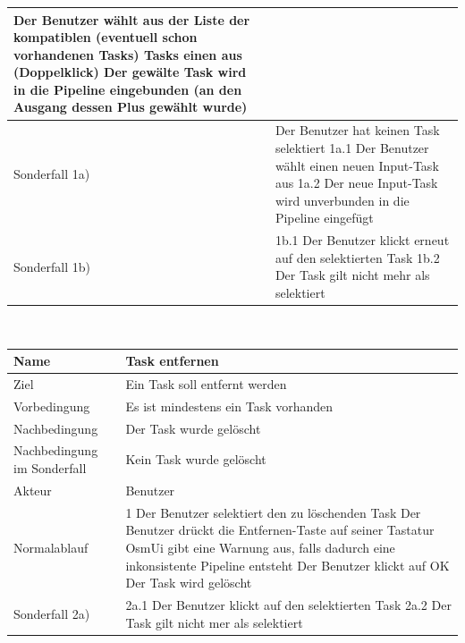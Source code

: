 \documentclass[a4paper,12pt]{scrartcl}
\begin{document}
\begin{center}
\begin{tabular}{|p{5cm}|p{10cm}|}
\newline 2 Der Benutzer wählt aus der Liste der kompatiblen (eventuell schon vorhandenen Tasks) Tasks einen aus (Doppelklick)
\newline 3 Der gewälte Task wird in die Pipeline eingebunden (an den Ausgang dessen Plus gewählt wurde)\\ 
\hline Sonderfall 1a) & Der Benutzer hat keinen Task selektiert
\newline 1a.1 Der Benutzer wählt einen neuen Input-Task aus
\newline 1a.2 Der neue Input-Task wird unverbunden in die Pipeline eingefügt\\
\hline Sonderfall 1b) & 1b.1 Der Benutzer klickt erneut auf den selektierten Task
\newline 1b.2 Der Task gilt nicht mehr als selektiert\\
\hline
\end{tabular}
\vspace{0.7cm}
\\
\begin{tabular}{|p{5cm}|p{10cm}|}
\hline Name & \textbf{Task entfernen} \\ 
\hline Ziel & Ein Task soll entfernt werden \\ 
\hline Vorbedingung & Es ist mindestens ein Task vorhanden \\ 
\hline Nachbedingung & Der Task wurde gelöscht \\ 
\hline Nachbedingung im Sonderfall & Kein Task wurde gelöscht \\ 
\hline Akteur & Benutzer \\ 
\hline Normalablauf & 1 Der Benutzer selektiert den zu löschenden Task
\newline 2 Der Benutzer drückt die Entfernen-Taste auf seiner Tastatur
\newline 3 OsmUi gibt eine Warnung aus, falls dadurch eine inkonsistente Pipeline entsteht
\newline 4 Der Benutzer klickt auf OK
\newline 5 Der Task wird gelöscht\\ 
\hline Sonderfall 2a) & 2a.1 Der Benutzer klickt auf den selektierten Task
\newline 2a.2 Der Task gilt nicht mer als selektiert\\
\hline 
\end{tabular}  
\vspace{0.7cm}
\\
\begin{tabular}{|p{5cm}|p{10cm}|}

\end{tabular}
\end{center}
\end{document}

